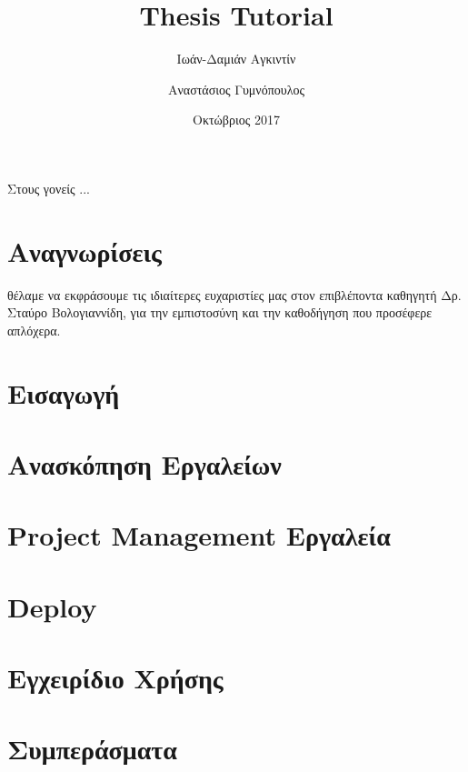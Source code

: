 \documentclass[12pt,twoside]{report}
\title{Thesis Tutorial}
\author{
\textgreek{Ιωάν-Δαμιάν Αγκιντίν}
\and
\textgreek{Αναστάσιος Γυμνόπουλος}
}
\date{\textgreek{Οκτώβριος} 2017}
\newcommand{\e}[1]{\foreignlanguage{english}{#1}}
\begin{document}







\chapter*{}
\begin{FlushRight}
Στους γονείς ...
\end{FlushRight}



\chapter*{Αναγνωρίσεις}
 θέλαμε να εκφράσουμε τις ιδιαίτερες ευχαριστίες μας στον επιβλέποντα καθηγητή Δρ. Σταύρο Βολογιαννίδη, για την εμπιστοσύνη και την καθοδήγηση που προσέφερε απλόχερα.

\tableofcontents

\listoffigures

\listoftables

\chapter{Εισαγωγή}


\chapter{Ανασκόπηση Εργαλείων}


\chapter{\e{Project Management} Εργαλεία}


\chapter{\e{Deploy}}


\chapter{Εγχειρίδιο Χρήσης}


\chapter{Συμπεράσματα}



\printbibliography
\end{document}
